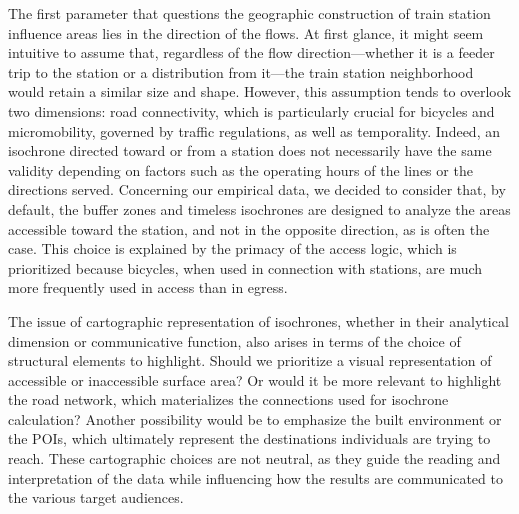 \begin{refsegment}
The first parameter that questions the geographic construction of train station influence areas lies in the direction of the flows. At first glance, it might seem intuitive to assume that, regardless of the flow direction—whether it is a feeder trip to the station or a distribution from it—the train station neighborhood would retain a similar size and shape. However, this assumption tends to overlook two dimensions: road connectivity, which is particularly crucial for bicycles and micromobility, governed by traffic regulations, as well as temporality. Indeed, an isochrone directed toward or from a station does not necessarily have the same validity depending on factors such as the operating hours of the lines or the directions served. Concerning our empirical data, we decided to consider that, by default, the buffer zones and timeless isochrones are designed to analyze the areas accessible toward the station, and not in the opposite direction, as is often the case. This choice is explained by the primacy of the access logic, which is prioritized because bicycles, when used in connection with stations, are much more frequently used in access than in egress.%

The issue of cartographic representation of isochrones, whether in their analytical dimension or communicative function, also arises in terms of the choice of structural elements to highlight. Should we prioritize a visual representation of accessible or inaccessible surface area? Or would it be more relevant to highlight the road network, which materializes the connections used for isochrone calculation? Another possibility would be to emphasize the built environment or the \acrfull{POIs}, which ultimately represent the destinations individuals are trying to reach. These cartographic choices are not neutral, as they guide the reading and interpretation of the data while influencing how the results are communicated to the various target audiences.%


\end{refsegment}
